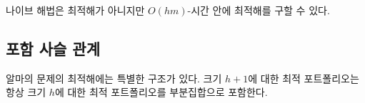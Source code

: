 \documentclass[11pt]{article} %
\newif\ifen
\newtheorem{corollary}{Corollary}
\theoremstyle{definition}
\newtheorem{corollary}{따름정리}
\theoremstyle{definition}
\begin{document}



\ifen
Although the na\"ive algorithm is inoptimal, we can still find the optimal solution in $O(hm)$-time, as we will now show.
\else
나이브 해법은 최적해가 아니지만 $O(hm)$-시간 안에 최적해를 구할 수 있다.
\fi

\ifen \subsection{The nestedness property}  \else \subsection{포함 사슬 관계} \fi
\ifen It turns out that the solution to Alma's problem possesses a special structure: An optimal portfolio of size $h+1$ includes an optimal portfolio of size $h$ as a subset.
\else 알마의 문제의 최적해에는 특별한 구조가 있다. 크기 $h+1$에 대한 최적 포트폴리오는 항상 크기 $h$에 대한 최적 포트폴리오를 부분집합으로 포함한다.\fi
\end{document}
